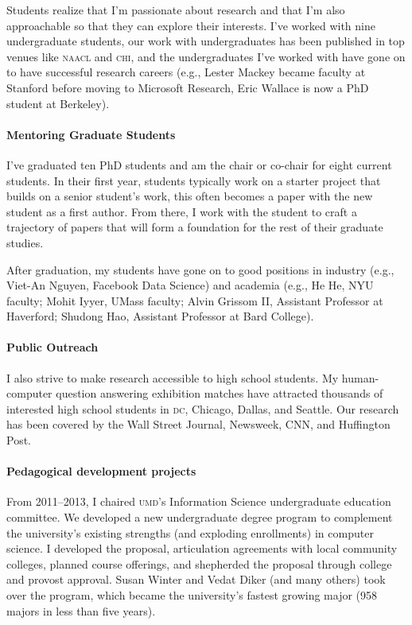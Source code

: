 \documentclass[11pt, amssymb, a4paper, one column]{article}
\newcommand{\abr}[1]{\textsc{#1}}
\begin{document}
Students realize that I'm passionate about research and that I'm also
approachable so that they can explore their interests. I've worked with nine
undergraduate students, our work with undergraduates has been published in top
venues like \abr{naacl} and \abr{chi}, and the undergraduates I've worked with
have gone on to have successful research careers (e.g., Lester Mackey became
faculty at Stanford before moving to Microsoft Research, Eric Wallace is now a
PhD student at Berkeley).

\paragraph{Mentoring Graduate Students}

I've graduated ten PhD students and am the chair or co-chair for eight
current students.  In their first year, students typically work on a
starter project that builds on a senior student's work, this often
becomes a paper with the new student as a first author.  From there, I
work with the student to craft a trajectory of papers that will form a
foundation for the rest of their graduate studies.

After graduation, my students have gone on to good positions in industry (e.g.,
Viet-An Nguyen, Facebook Data Science) and academia (e.g., He He, NYU faculty;
Mohit Iyyer, UMass faculty; Alvin Grissom II, Assistant Professor at
Haverford; Shudong Hao, Assistant Professor at Bard College).

\paragraph{Public Outreach}

I also strive to make research accessible to
high school students.  My human-computer question answering exhibition
matches have attracted thousands of interested high school students in
\abr{dc}, Chicago, Dallas, and Seattle.  Our research has been covered
by the Wall Street Journal, Newsweek, CNN, and Huffington Post.

\paragraph{Pedagogical development projects}

From 2011--2013, I chaired \abr{umd}'s Information Science
undergraduate education committee. We developed a new undergraduate
degree program to complement the university's existing strengths (and
exploding enrollments) in computer science. I developed the
proposal, articulation agreements with local community colleges,
planned course offerings, and shepherded the proposal through college
and provost approval.  Susan Winter and Vedat Diker (and many others)
took over the program, which became the university's fastest growing
major (958 majors in less than five years).
\end{document}

